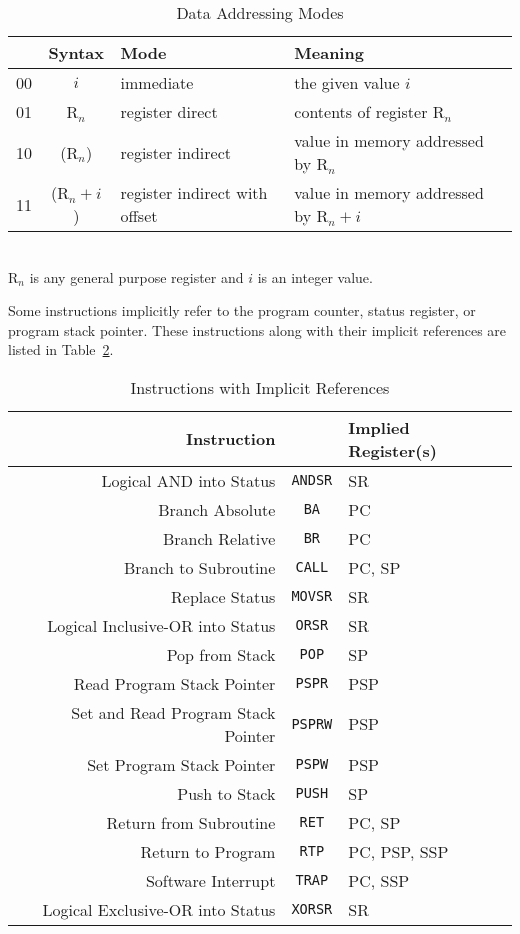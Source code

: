 \documentclass[12pt,english]{book}
\begin{document}
\begin{table}[htb]\centering
  \caption{Data Addressing Modes}
  \label{tbl:addr-modes}
  \begin{tabular}{ccll}
    \toprule
    &Syntax&Mode&Meaning\\
    \midrule
    00&\(i\)&immediate&the given value \(i\)\\
    01&R\({}_n\)&register direct&contents of register R\({}_n\)\\
    10&(R\({}_n\))&register indirect&value in memory
    addressed by R\({}_n\)\\
    11&(R\({}_n+i\))&register indirect with offset
    &value in memory addressed by R\({}_n+i\)\\
    \bottomrule
  \end{tabular}\\
  R\({}_n\) is any general purpose register
  and \(i\) is an integer value.
\end{table}

Some instructions implicitly refer to the program counter,
status register, or program stack pointer.
These instructions along with their implicit references
are listed in Table~\ref{tbl:implicit-refs}.

\begin{table}[htb]
  \caption{Instructions with Implicit References}
  \label{tbl:implicit-refs}
  \centering
  \begin{tabular}{rcl}
    \toprule
    Instruction&&Implied Register(s)\\
    \midrule
    Logical AND into Status&\texttt{ANDSR}&SR\\
    Branch Absolute&\texttt{BA}&PC\\
    Branch Relative&\texttt{BR}&PC\\
    Branch to Subroutine&\texttt{CALL}&PC, SP\\
    Replace Status&\texttt{MOVSR}&SR\\
    Logical Inclusive-OR into Status&\texttt{ORSR}&SR\\
    Pop from Stack&\texttt{POP}&SP\\
    Read Program Stack Pointer&\texttt{PSPR}&PSP\\
    Set and Read Program Stack Pointer&\texttt{PSPRW}&PSP\\
    Set Program Stack Pointer&\texttt{PSPW}&PSP\\
    Push to Stack&\texttt{PUSH}&SP\\
    Return from Subroutine&\texttt{RET}&PC, SP\\
    Return to Program&\texttt{RTP}&PC, PSP, SSP\\
    Software Interrupt&\texttt{TRAP}&PC, SSP\\
    Logical Exclusive-OR into Status&\texttt{XORSR}&SR\\
    \bottomrule
  \end{tabular}
\end{table}
\end{document}
